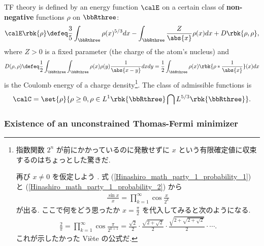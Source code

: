 \documentclass[openany, a4paper, oneside]{jsbook}
\begin{document}
TF theory is defined by an energy function $\calE$ on a certain class of \textbf{non-negative} functions $\rho$ on $\bbRthree$:
\begin{align}
 \calE \rbk{\rho}
 \defeq
 \frac{3}{5} \int_{\bbRthree} \rho (x)^{5/3} dx - \int_{\bbRthree} \frac{Z}{\abs{x}} \rho (x) dx + D \rbk{\rho, \rho}, \label{Lieb-Loss_Analysis_chap11_17}
\end{align}
where $Z > 0$ is a fixed parameter (the charge of the atom's nucleus) and
\begin{align}
 D (\rho, \rho)
 \defeq
 \frac{1}{2} \int_{\bbRthree} \int_{\bbRthree} \rho (x) \rho (y) \frac{1}{\abs{x - y}} dx dy
 =
 \frac{1}{2} \int_{\bbRthree} \rho (x) \rbk{\rho * \frac{1}{\abs{x}}}(x) dx
\end{align}
is the Coulomb energy of a charge density\footnote{指数関数 $2^n$ が前にかかっているのに発散せずに $x$ という有限確定値に収束するのはちょっとした驚きだ.

再び $x \neq 0$ を仮定しよう \footnotemark.
式 (\ref{Hinashiro_math_party_1_probability_1}) と (\ref{Hinashiro_math_party_1_probability_2}) から
\begin{align}
 \frac{\sin x}{x}
 =
 \prod_{k=1}^{\infty} \cos \frac{x}{2^{k}} \label{Hinashiro_math_party_1_probability_3}
\end{align}
が出る.
ここで何をどう思ったか $x = \frac{\pi}{2}$ を代入してみると次のようになる.
\begin{align}
 \frac{2}{\pi}
 =
 \prod_{k=1}^{\infty} \cos \frac{\pi}{2^{k+1}}
 =
 \frac{\sqrt{2}}{2} \cdot \frac{\sqrt{2 + \sqrt{2}}}{2} \cdot \frac{\sqrt{2 + \sqrt{2 + \sqrt{2}}}}{2} \cdot \cdots.
\end{align}
これが示したかった Vi\`ete の公式だ.}.
The class of admissible functions is
\begin{align}
 \calC
 =
 \set{\rho}{\rho \geq 0, \rho \in L^1 \rbk{\bbRthree} \bigcap L^{5/3} \rbk{\bbRthree}}.
\end{align}
\subsubsection{Existence of an unconstrained Thomas-Fermi minimizer}
\end{document}
